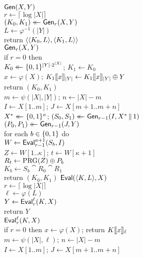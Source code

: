 \begin{figure}
  {
    \underline{$\gen(X,Y)$}\\[2pt]
      $r \gets \lceil \log |X| \rceil$\\
      $(K_0, K_1) \getsr \gen_r(X,Y)$\\
      $L \gets \varphi^{-1}(|Y|)$\\
      return $\str(\str(K_0, L), \str(K_1, L))$
    \\[6pt]
    \underline{$\gen_{r}(X, Y)$}\\[2pt]
      if $r=0$ then\\
      \tab $K_0 \getsr \bits^{|Y|\cdot2^{|X|}}$; $K_1 \gets K_0$\\
      \tab $x \gets \varphi(X)$; $\block{|Y|}{K_1}{x} \gets \block{|Y|}{K_1}{x} \xor Y$\\
      \tab return $(K_0, K_1)$\\
      $m \gets \psi(|X|, |Y|)$; $n \gets |X| - m$\\
      $I \gets X[1..m]$; $J \gets X[m+1..m+n]$\\
      $X^* \getsr \bits^\kappa$;
      $(S_0, S_1) \getsr \gen_{r-1}(I, X^*\cat 1)$\\
      $(P_0, P_1) \getsr \gen_{r-1}(J, Y)$\\
      for each $b\in \bits$ do\\
      \tab $W \gets \eval_{r-1}^{\kappa+1}(S_b, I)$\\
      \tab $Z \gets W[1..\kappa]$; $t \gets W[\kappa+1]$\\
      \tab $R_t \gets \prg(Z) \xor P_b$\\
      \tab $K_b \gets S_b \cat R_0 \cat R_1$\\
      return $(K_0, K_1)$
  }
  {
    \underline{$\eval(\str(K,L), X)$}\\[2pt]
      $r \gets \lceil \log |X| \rceil$\\
      $\ell \gets \varphi(L)$\\
      $Y \gets \eval^\ell_r(K, X)$\\
      return $Y$
    \\[6pt]
    \underline{$\eval_{r}^\ell(K, X)$}\\[2pt]
      if $r=0$ then $x \gets \varphi(X)$; return $\block{\ell}{K}{x}$\\
      $m \gets \psi(|X|, \ell)$; $n \gets |X| - m$\\
      $I \gets X[1..m]$; $J \gets X[m+1..m+n]$\\
      \\
}
\end{figure}
